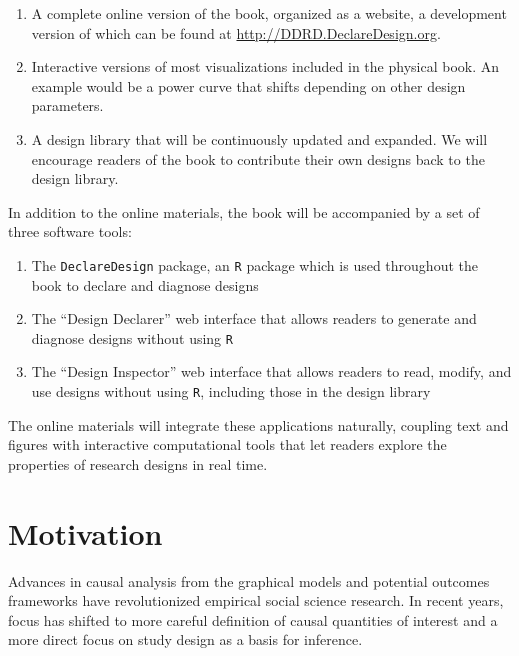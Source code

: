 \documentclass[11pt]{article}
\begin{document}
\begin{enumerate}
	\item A complete online version of the book, organized as a website, a development version of which can be found at \url{http://DDRD.DeclareDesign.org}.
	\item Interactive versions of most visualizations included in the physical book. An example would be a power curve that shifts depending on other design parameters.
	\item A design library that will be continuously updated and expanded. We will encourage readers of the book to contribute their own designs back to the design library.
\end{enumerate}

In addition to the online materials, the book will be accompanied by a set of three software tools:

\begin{enumerate}
\item The \texttt{DeclareDesign} package, an \texttt{R}  package which is used throughout the book to declare and diagnose designs
\item The ``Design Declarer'' web interface that allows readers to generate and diagnose designs without using  \texttt{R}  
\item The ``Design Inspector'' web interface that allows readers to read, modify, and use designs without using  \texttt{R}, including those in the design library
\end{enumerate}

The online materials will integrate these applications naturally, coupling text and figures with interactive computational tools that let readers explore the properties of research designs in real time. 

\section{Motivation}

Advances in causal analysis from the graphical models and potential outcomes frameworks have revolutionized empirical social science research. In recent years, focus has shifted to more careful definition of causal quantities of interest and a more direct focus on study design as a basis for inference.
\end{document}
